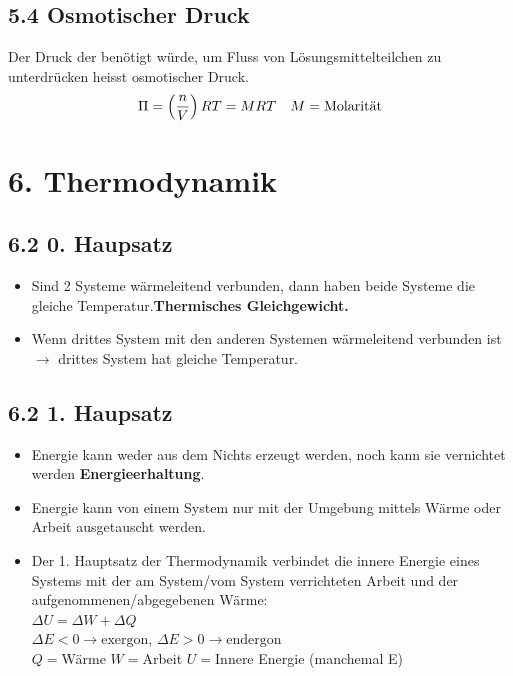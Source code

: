 \begin{multicols*}{4}
\subsection{5.4 Osmotischer Druck}{
    Der Druck der benötigt würde, um Fluss von Lösungsmittelteilchen zu unterdrücken heisst
osmotischer Druck.
\begin{equation*}
    \Pi = \left(\frac{n}{V}\right)RT=MRT \text{\quad} M = \text{Molarität}
\end{equation*}
}





\section{6. Thermodynamik}
\subsection{6.2 0. Haupsatz}{
\begin{itemize}[noitemsep, leftmargin=*]
    \item Sind 2 Systeme wärmeleitend verbunden, dann haben beide Systeme die gleiche
            Temperatur.\textbf{Thermisches Gleichgewicht.}
    \item Wenn drittes System mit den anderen Systemen wärmeleitend verbunden ist $\rightarrow$ 
         drittes System hat gleiche Temperatur.
\end{itemize}

}
\subsection{6.2 1. Haupsatz}{
\begin{itemize}[noitemsep, leftmargin=*]
    \item Energie kann weder aus dem Nichts erzeugt werden, noch kann sie vernichtet werden \textbf{Energieerhaltung}.
    \item Energie kann von einem System nur mit der Umgebung mittels Wärme oder Arbeit ausgetauscht werden.
    \item Der 1. Hauptsatz der Thermodynamik verbindet die innere Energie eines Systems mit der am System/vom System verrichteten Arbeit und der aufgenommenen/abgegebenen Wärme:\\
    $\Delta U = \Delta W+\Delta Q$\\
    $\Delta E < 0 \rightarrow \text{exergon}$,   $\Delta E > 0 \rightarrow \text{endergon}$\\
    $Q=$Wärme   $W=$Arbeit   $U=$Innere Energie (manchemal E)
\end{itemize}
}


\end{multicols*}
